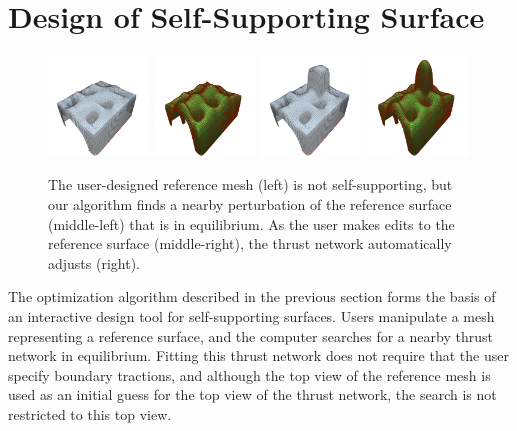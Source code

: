 \documentclass[annual]{acmsiggraph}
\begin{document}
\section{Design of Self-Supporting Surface} \label{sec:design}
\begin{figure}[!tb]
\centering
\includegraphics[width=0.24\textwidth]{fig/build.png} \includegraphics[width=0.24\textwidth]{fig/build-n.png}
\hfill
\includegraphics[width=0.24\textwidth]{fig/build-edited.png} \includegraphics[width=0.24\textwidth]{fig/build-edited-n.png}
\caption{The user-designed reference mesh (left) is not self-supporting, but our algorithm finds a nearby perturbation of the reference surface (middle-left) that is in equilibrium. As the user makes edits to the reference surface (middle-right), the thrust network automatically adjusts (right). \label{fig:vault}}
\end{figure}

The optimization algorithm described in the previous section forms the 
basis of an interactive design tool for self-supporting surfaces. Users 
manipulate a mesh representing a reference surface, and the computer 
searches for a nearby thrust network in equilibrium. Fitting this thrust 
network does not require that the user specify boundary tractions, and 
although the top view of the reference mesh is used as an initial guess 
for the top view of the thrust network, the search is not restricted to 
this top view.
\end{document}
